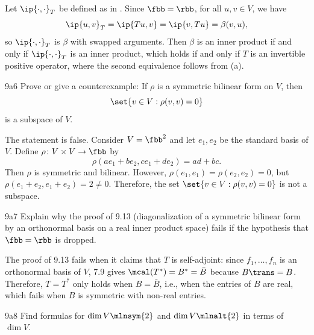 \begin{sol}
    Let $\ip{\cdot, \cdot}_T$ be defined as in .
    Since $\fbb = \rbb$, for all $u, v \in V$, we have
    \[
        \ip{u, v}_T = \ip{T u, v} = \ip{v, T u} = \beta(v, u),
    \]
    so $\ip{\cdot, \cdot}_T$ is $\beta$ with swapped arguments.
    Then $\beta$ is an inner product if and only if $\ip{\cdot, \cdot}_T$ is an inner product, which holds if and only if $T$ is an invertible positive operator, where the second equivalence follows from (a).
\end{sol}

\begin{exercise}{9a6}
    Prove or give a counterexample: If $\rho$ is a symmetric bilinear form on $V$, then
    \[
        \set{v \in V : \rho(v, v) = 0}
    \]
    is a subspace of $V$.
\end{exercise}

\begin{sol}
    The statement is false.
    Consider $V = \fbb^2$ and let $e_1, e_2$ be the standard basis of $V$.
    Define $\rho \colon V \times V \to \fbb$ by
    \[
        \rho(a e_1 + b e_2, c e_1 + d e_2) = ad + bc.
    \]
    Then $\rho$ is symmetric and bilinear.
    However, $\rho(e_1, e_1) = \rho(e_2, e_2) = 0$, but $\rho(e_1 + e_2, e_1 + e_2) = 2 \neq 0$.
    Therefore, the set $\set{v \in V : \rho(v, v) = 0}$ is not a subspace.
\end{sol}

\begin{exercise}{9a7}
    Explain why the proof of 9.13 (diagonalization of a symmetric bilinear form by an orthonormal basis on a real inner product space) fails if the hypothesis that $\fbb = \rbb$ is dropped.

\end{exercise}

\begin{sol}
    The proof of 9.13 fails when it claims that $T$ is self-adjoint:
    since $f_1, \ldots, f_n$ is an orthonormal basis of $V$, 7.9 gives $\mcal(T^\ast) = B^\ast = \bar B$ because $B\trans = B$.
    Therefore, $T = T^\ast$ only holds when $B = \bar B$, i.e., when the entries of $B$ are real, which fails when $B$ is symmetric with non-real entries.
\end{sol}

\begin{exercise}{9a8}
    Find formulas for $\dim V\mlnsym{2}$ and $\dim V\mlnalt{2}$ in terms of $\dim V$.
\end{exercise}


